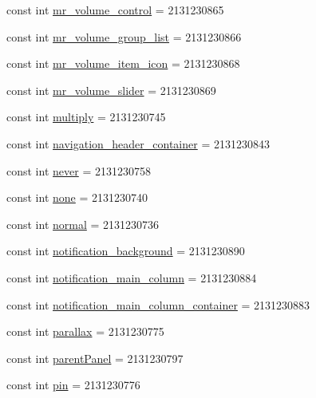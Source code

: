 \begin{CompactItemize}
const int \hyperlink{class__2doo_1_1_droid_1_1_resource_1_1_id_ef1ff30e5a8a73c38b69e425069b782b}{mr\_\-volume\_\-control} = 2131230865
\item 
const int \hyperlink{class__2doo_1_1_droid_1_1_resource_1_1_id_49526d51e1726d006547bcd71cb03336}{mr\_\-volume\_\-group\_\-list} = 2131230866
\item 
const int \hyperlink{class__2doo_1_1_droid_1_1_resource_1_1_id_c8e13567db3929732089accc1779f912}{mr\_\-volume\_\-item\_\-icon} = 2131230868
\item 
const int \hyperlink{class__2doo_1_1_droid_1_1_resource_1_1_id_ac4c4f88512ba0ba1bb1bc7a065ac3d1}{mr\_\-volume\_\-slider} = 2131230869
\item 
const int \hyperlink{class__2doo_1_1_droid_1_1_resource_1_1_id_e058b3bf413d70561bf5f2636b08358b}{multiply} = 2131230745
\item 
const int \hyperlink{class__2doo_1_1_droid_1_1_resource_1_1_id_95ea48cee04b758f223b157ca4713e1b}{navigation\_\-header\_\-container} = 2131230843
\item 
const int \hyperlink{class__2doo_1_1_droid_1_1_resource_1_1_id_74794284d8e8d2ed5a7f0e2efb1dbea6}{never} = 2131230758
\item 
const int \hyperlink{class__2doo_1_1_droid_1_1_resource_1_1_id_381e5caed25b976b0325a333433491dd}{none} = 2131230740
\item 
const int \hyperlink{class__2doo_1_1_droid_1_1_resource_1_1_id_22cd358dc080de5118595c5b8655f7aa}{normal} = 2131230736
\item 
const int \hyperlink{class__2doo_1_1_droid_1_1_resource_1_1_id_71dc10e3b13f3e2b62da57ca42ebc14d}{notification\_\-background} = 2131230890
\item 
const int \hyperlink{class__2doo_1_1_droid_1_1_resource_1_1_id_f5e412f7e23409292f0f6eb1c59a197f}{notification\_\-main\_\-column} = 2131230884
\item 
const int \hyperlink{class__2doo_1_1_droid_1_1_resource_1_1_id_3669e89c783cf40dc6e69cddd89fe415}{notification\_\-main\_\-column\_\-container} = 2131230883
\item 
const int \hyperlink{class__2doo_1_1_droid_1_1_resource_1_1_id_65c593b161a0a4b8405ba1684fff903a}{parallax} = 2131230775
\item 
const int \hyperlink{class__2doo_1_1_droid_1_1_resource_1_1_id_b04a5ec06293573c38508cd49f9ef7a3}{parentPanel} = 2131230797
\item 
const int \hyperlink{class__2doo_1_1_droid_1_1_resource_1_1_id_1359070e895088a8f65ee06e83923429}{pin} = 2131230776

\end{CompactItemize}
